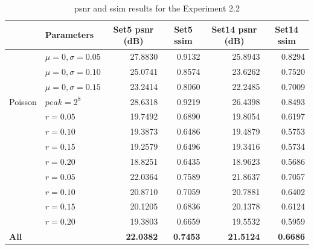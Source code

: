 \begin{table}[]
	\centering
	\begin{tabular}{|l|l|r|r|r|r|}
		\hline
		\rowcolor[HTML]{EFEFEF} 
		\multicolumn{1}{|c|}{\cellcolor[HTML]{EFEFEF}\textbf{Noise}} & \textbf{Parameters} & \multicolumn{1}{c|}{\cellcolor[HTML]{EFEFEF}\textbf{Set5 \gls{psnr} (dB)}} & \multicolumn{1}{c|}{\cellcolor[HTML]{EFEFEF}\textbf{Set5 \gls{ssim}}} & \multicolumn{1}{c|}{\cellcolor[HTML]{EFEFEF}\textbf{Set14 \gls{psnr} (dB)}} & \multicolumn{1}{c|}{\cellcolor[HTML]{EFEFEF}\textbf{Set14 \gls{ssim}}} \\ \hline
		\rowcolor[HTML]{FFFFFF} 
		\cellcolor[HTML]{EFEFEF} & $\mu=0, \sigma=0.05$ & 27.8830 & 0.9132 & 25.8943 & 0.8294 \\
		\rowcolor[HTML]{EFEFEF} 
		\cellcolor[HTML]{EFEFEF} & $\mu=0, \sigma=0.10$ & 25.0741 & 0.8574 & 23.6262 & 0.7520 \\
		\rowcolor[HTML]{FFFFFF} 
		\multirow{-3}{*}{\cellcolor[HTML]{EFEFEF}Gaussian} & $\mu=0, \sigma=0.15$ & 23.2414 & 0.8060 & 22.2485 & 0.7009 \\
		\rowcolor[HTML]{EFEFEF} 
		Poisson & $peak=2^8$ & 28.6318 & 0.9219 & 26.4398 & 0.8493 \\
		\rowcolor[HTML]{FFFFFF} 
		\cellcolor[HTML]{EFEFEF} & $r=0.05$ & 19.7492 & 0.6890 & 19.8054 & 0.6197 \\
		\rowcolor[HTML]{EFEFEF} 
		\cellcolor[HTML]{EFEFEF} & $r=0.10$ & 19.3873 & 0.6486 & 19.4879 & 0.5753 \\
		\rowcolor[HTML]{FFFFFF} 
		\cellcolor[HTML]{EFEFEF} & $r=0.15$ & 19.2579 & 0.6496 & 19.3416 & 0.5734 \\
		\rowcolor[HTML]{EFEFEF} 
		\multirow{-4}{*}{\cellcolor[HTML]{EFEFEF}Salt-and-pepper} & $r=0.20$ & 18.8251 & 0.6435 & 18.9623 & 0.5686 \\
		\rowcolor[HTML]{FFFFFF} 
		\cellcolor[HTML]{EFEFEF} & $r=0.05$ & 22.0364 & 0.7589 & 21.8637 & 0.7057 \\
		\rowcolor[HTML]{EFEFEF} 
		\cellcolor[HTML]{EFEFEF} & $r=0.10$ & 20.8710 & 0.7059 & 20.7881 & 0.6402 \\
		\rowcolor[HTML]{FFFFFF} 
		\cellcolor[HTML]{EFEFEF} & $r=0.15$ & 20.1205 & 0.6836 & 20.1378 & 0.6124 \\
		\rowcolor[HTML]{EFEFEF} 
		\multirow{-4}{*}{\cellcolor[HTML]{EFEFEF}Uniform} & $r=0.20$ & 19.3803 & 0.6659 & 19.5532 & 0.5959 \\
		\rowcolor[HTML]{FFFFFF} 
		\textbf{All} &  & \textbf{22.0382} & \textbf{0.7453} & \textbf{21.5124} & \textbf{0.6686}\\\hline
	\end{tabular}
	\caption{\gls{psnr} and \gls{ssim} results for the Experiment 2.2}
	\label{tab:experiment22}
\end{table}

